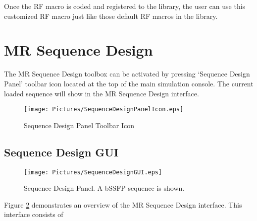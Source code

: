 \documentclass{book}%
\begin{document}
Once the RF macro is coded and registered to the library, the user can use this customized RF macro just like those default RF macros in the library.

\section{MR Sequence Design}

The MR Sequence Design toolbox can be activated by pressing `Sequence Design Panel' toolbar icon located at the top of the main simulation console. The current loaded sequence will show in the MR Sequence Design interface.

\begin{figure}[htbp]
	\centering
		\texttt{[image: Pictures/SequenceDesignPanelIcon.eps]}
	\caption{Sequence Design Panel Toolbar Icon}
	\label{fig:SequenceDesignPanelIcon}
\end{figure}

\subsection{Sequence Design GUI}

\begin{figure}[htbp]
	\centering
		\texttt{[image: Pictures/SequenceDesignGUI.eps]}
	\caption{Sequence Design Panel. A bSSFP sequence is shown.}
	\label{fig:SequenceDesignGUI}
\end{figure}

Figure \ref{fig:SequenceDesignGUI} demonstrates an overview of the MR Sequence Design interface. This interface consists of 
\end{document}
